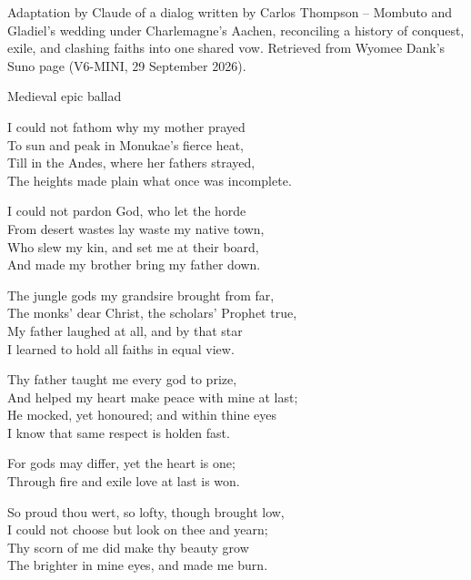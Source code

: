 
\begin{notes}
Adaptation by Claude of a dialog written by Carlos Thompson -- Mombuto and Gladiel's wedding under Charlemagne's Aachen, reconciling a history of conquest, exile, and clashing faiths into one shared vow. Retrieved from Wyomee Dank's Suno page (V6-MINI, 29 September 2026).
\end{notes}
\begin{style}
Medieval epic ballad
\end{style}
\begin{lyrics}
I could not fathom why my mother prayed\\
To sun and peak in Monukae's fierce heat,\\
Till in the Andes, where her fathers strayed,\\
The heights made plain what once was incomplete.

I could not pardon God, who let the horde\\
From desert wastes lay waste my native town,\\
Who slew my kin, and set me at their board,\\
And made my brother bring my father down.

The jungle gods my grandsire brought from far,\\
The monks' dear Christ, the scholars' Prophet true,\\
My father laughed at all, and by that star\\
I learned to hold all faiths in equal view.

Thy father taught me every god to prize,\\
And helped my heart make peace with mine at last;\\
He mocked, yet honoured; and within thine eyes\\
I know that same respect is holden fast.

For gods may differ, yet the heart is one;\\
Through fire and exile love at last is won.

So proud thou wert, so lofty, though brought low,\\
I could not choose but look on thee and yearn;\\
Thy scorn of me did make thy beauty grow\\
The brighter in mine eyes, and made me burn.


\end{lyrics}
